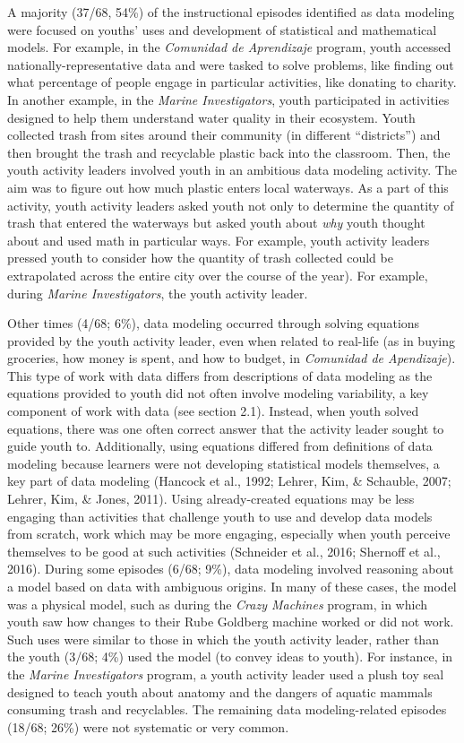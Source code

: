 \documentclass[]{msu-thesis}
\theoremstyle{definition}
\theoremstyle{definition}
\theoremstyle{definition}
\theoremstyle{remark}
\begin{document}
A majority (37/68, 54\%) of the instructional episodes identified as
data modeling were focused on youths' uses and development of
statistical and mathematical models. For example, in the \emph{Comunidad
de Aprendizaje} program, youth accessed nationally-representative data
and were tasked to solve problems, like finding out what percentage of
people engage in particular activities, like donating to charity. In
another example, in the \emph{Marine Investigators}, youth participated
in activities designed to help them understand water quality in their
ecosystem. Youth collected trash from sites around their community (in
different ``districts'') and then brought the trash and recyclable
plastic back into the classroom. Then, the youth activity leaders
involved youth in an ambitious data modeling activity. The aim was to
figure out how much plastic enters local waterways. As a part of this
activity, youth activity leaders asked youth not only to determine the
quantity of trash that entered the waterways but asked youth about
\emph{why} youth thought about and used math in particular ways. For
example, youth activity leaders pressed youth to consider how the
quantity of trash collected could be extrapolated across the entire city
over the course of the year). For example, during \emph{Marine
Investigators}, the youth activity leader.

Other times (4/68; 6\%), data modeling occurred through solving
equations provided by the youth activity leader, even when related to
real-life (as in buying groceries, how money is spent, and how to
budget, in \emph{Comunidad de Apendizaje}). This type of work with data
differs from descriptions of data modeling as the equations provided to
youth did not often involve modeling variability, a key component of
work with data (see section 2.1). Instead, when youth solved equations,
there was one often correct answer that the activity leader sought to
guide youth to. Additionally, using equations differed from definitions
of data modeling because learners were not developing statistical models
themselves, a key part of data modeling (Hancock et al., 1992; Lehrer,
Kim, \& Schauble, 2007; Lehrer, Kim, \& Jones, 2011). Using
already-created equations may be less engaging than activities that
challenge youth to use and develop data models from scratch, work which
may be more engaging, especially when youth perceive themselves to be
good at such activities (Schneider et al., 2016; Shernoff et al., 2016).
During some episodes (6/68; 9\%), data modeling involved reasoning about
a model based on data with ambiguous origins. In many of these cases,
the model was a physical model, such as during the \emph{Crazy Machines}
program, in which youth saw how changes to their Rube Goldberg machine
worked or did not work. Such uses were similar to those in which the
youth activity leader, rather than the youth (3/68; 4\%) used the model
(to convey ideas to youth). For instance, in the \emph{Marine
Investigators} program, a youth activity leader used a plush toy seal
designed to teach youth about anatomy and the dangers of aquatic mammals
consuming trash and recyclables. The remaining data modeling-related
episodes (18/68; 26\%) were not systematic or very common.
\end{document}
